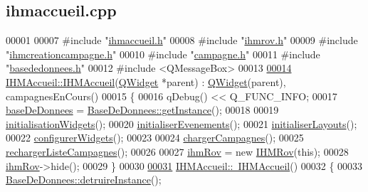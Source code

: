 \hypertarget{ihmaccueil_8cpp_source}{}\subsection{ihmaccueil.\+cpp}
\label{ihmaccueil_8cpp_source}

\begin{DoxyCode}
00001 
00007 \textcolor{preprocessor}{#include "\hyperlink{ihmaccueil_8h}{ihmaccueil.h}"}
00008 \textcolor{preprocessor}{#include "\hyperlink{ihmrov_8h}{ihmrov.h}"}
00009 \textcolor{preprocessor}{#include "\hyperlink{ihmcreationcampagne_8h}{ihmcreationcampagne.h}"}
00010 \textcolor{preprocessor}{#include "\hyperlink{campagne_8h}{campagne.h}"}
00011 \textcolor{preprocessor}{#include "\hyperlink{basededonnees_8h}{basededonnees.h}"}
00012 \textcolor{preprocessor}{#include <QMessageBox>}
00013 
\hyperlink{class_i_h_m_accueil_a66cf4d5655e3132c1d313b76f3905e52}{00014} \hyperlink{class_i_h_m_accueil_a66cf4d5655e3132c1d313b76f3905e52}{IHMAccueil::IHMAccueil}(\hyperlink{class_q_widget}{QWidget} *parent) : \hyperlink{class_q_widget}{QWidget}(parent), 
      campagnesEnCours()
00015 \{
00016     qDebug() << Q\_FUNC\_INFO;
00017     \hyperlink{class_i_h_m_accueil_ab56d9846c071396a92f88272880e2c1f}{baseDeDonnees} = \hyperlink{class_base_de_donnees_a58beb2f702f75b257e2e55e25d9f979b}{BaseDeDonnees::getInstance}();
00018 
00019     \hyperlink{class_i_h_m_accueil_a1385a94c1a3d75d813429dc9bdc4b050}{initialisationWidgets}();
00020     \hyperlink{class_i_h_m_accueil_a5a571ab8f264c275580501753bb00674}{initialiserEvenements}();
00021     \hyperlink{class_i_h_m_accueil_acaaa5d756165801403ea7d73ae40186b}{initialiserLayouts}();
00022     \hyperlink{class_i_h_m_accueil_a63bc796a325066423ed6146b8bab1437}{configurerWidgets}();
00023 
00024     \hyperlink{class_i_h_m_accueil_a1ed3efefdf929c0d2a6b6d1bb10bbc27}{chargerCampagnes}();
00025     \hyperlink{class_i_h_m_accueil_a44074f2d8d59e0d1b7a3d50c24d2a0df}{rechargerListeCampagnes}();
00026 
00027     \hyperlink{class_i_h_m_accueil_af9f2613056b21bdf82e8f54a26146acc}{ihmRov} = \textcolor{keyword}{new} \hyperlink{class_i_h_m_rov}{IHMRov}(\textcolor{keyword}{this});
00028     \hyperlink{class_i_h_m_accueil_af9f2613056b21bdf82e8f54a26146acc}{ihmRov}->hide();
00029 \}
00030 
\hyperlink{class_i_h_m_accueil_a5ea3926747dada8b9677ab9a33c03139}{00031} \hyperlink{class_i_h_m_accueil_a5ea3926747dada8b9677ab9a33c03139}{IHMAccueil::~IHMAccueil}()
00032 \{
00033     \hyperlink{class_base_de_donnees_a457401c0816b888c77ce915997545f4e}{BaseDeDonnees::detruireInstance}();

\end{DoxyCode}
